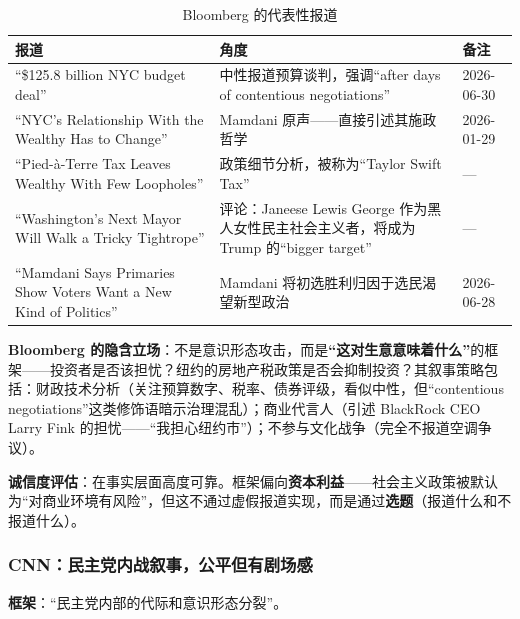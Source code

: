\documentclass[12pt,a4paper]{ctexart}
\begin{document}
\begin{table}[h]
\centering
\caption{Bloomberg 的代表性报道}
\begin{tabular}{@{}lp{7.6cm}p{4.6cm}@{}}
\toprule
\textbf{报道} & \textbf{角度} & \textbf{备注} \\
\midrule
``\$125.8 billion NYC budget deal'' & 中性报道预算谈判，强调``after days of contentious negotiations'' & 2026-06-30 \\
``NYC's Relationship With the Wealthy Has to Change'' & Mamdani 原声——直接引述其施政哲学 & 2026-01-29 \\
``Pied-à-Terre Tax Leaves Wealthy With Few Loopholes'' & 政策细节分析，被称为``Taylor Swift Tax'' & --- \\
``Washington's Next Mayor Will Walk a Tricky Tightrope'' & 评论：Janeese Lewis George 作为黑人女性民主社会主义者，将成为 Trump 的``bigger target'' & --- \\
``Mamdani Says Primaries Show Voters Want a New Kind of Politics'' & Mamdani 将初选胜利归因于选民渴望新型政治 & 2026-06-28 \\
\bottomrule
\end{tabular}
\end{table}

\textbf{Bloomberg 的隐含立场}：不是意识形态攻击，而是\textbf{``这对生意意味着什么''}的框架——投资者是否该担忧？纽约的房地产税政策是否会抑制投资？其叙事策略包括：财政技术分析（关注预算数字、税率、债券评级，看似中性，但``contentious negotiations''这类修饰语暗示治理混乱）；商业代言人（引述 BlackRock CEO Larry Fink 的担忧——``我担心纽约市''）；不参与文化战争（完全不报道空调争议）。

\textbf{诚信度评估}：在事实层面高度可靠。框架偏向\textbf{资本利益}——社会主义政策被默认为``对商业环境有风险''，但这不通过虚假报道实现，而是通过\textbf{选题}（报道什么和不报道什么）。

\subsubsection{CNN：民主党内战叙事，公平但有剧场感}

\textbf{框架}：``民主党内部的代际和意识形态分裂''。
\end{document}

